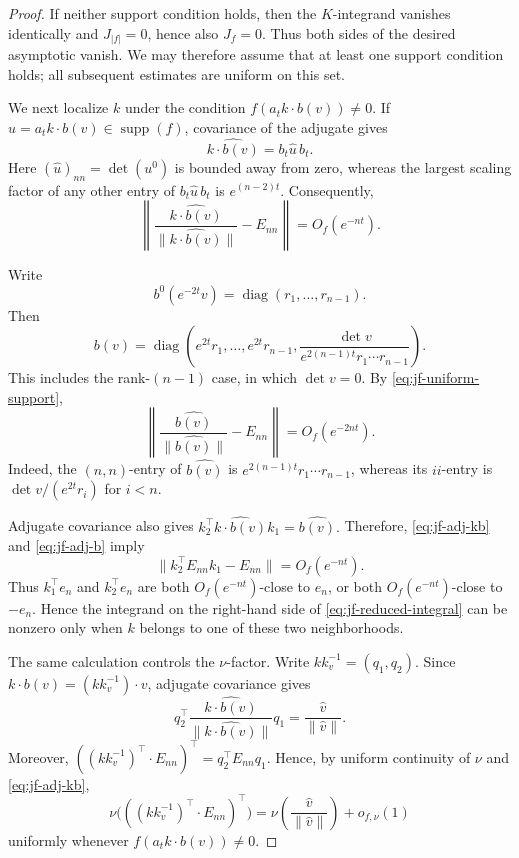 \documentclass[reqno,11pt]{amsart}
\numberwithin{equation}{section}
\theoremstyle{definition}
\theoremstyle{remark}
\newcommand{\op}{\operatorname}
\newcommand{\diag}{\op{diag}}
\begin{document}
\begin{proof}
If neither support condition holds, then the $K$-integrand vanishes
identically and $J_{|f|}=0$, hence also $J_f=0$. Thus both sides of the
desired asymptotic vanish. We may therefore assume that at least one
support condition holds; all subsequent estimates are uniform on this
set.

We next localize $k$ under the condition
$f(a_tk\cdot b(v))\ne0$. If
$u=a_tk\cdot b(v)\in\operatorname{supp}(f)$, covariance of the
adjugate gives
$$
\widehat{k\cdot b(v)}=b_t\widehat u\,b_t.
$$
Here $(\widehat u)_{nn}=\det(u^0)$ is bounded away from zero, whereas
the largest scaling factor of any other entry of
$b_t\widehat u\,b_t$ is $e^{(n-2)t}$. Consequently,
\begin{equation}\label{eq:jf-adj-kb}
\left\|
\frac{\widehat{k\cdot b(v)}}{\|\widehat{k\cdot b(v)}\|}-E_{nn}
\right\|
=O_f(e^{-nt}).
\end{equation}

Write
$$
b^0(e^{-2t}v)=\diag(r_1,\ldots,r_{n-1}).
$$
Then
$$
b(v)=\diag\left(
e^{2t}r_1,\ldots,e^{2t}r_{n-1},
\frac{\det v}{e^{2(n-1)t}r_1\cdots r_{n-1}}
\right).
$$
This includes the rank-$(n-1)$ case, in which $\det v=0$. By
\eqref{eq:jf-uniform-support},
\begin{equation}\label{eq:jf-adj-b}
\left\|
\frac{\widehat{b(v)}}{\|\widehat{b(v)}\|}-E_{nn}
\right\|
=O_f(e^{-2nt}).
\end{equation}
Indeed, the $(n, n)$-entry of $\widehat{b(v)}$ is
$e^{2(n-1)t}r_1\cdots r_{n-1}$, whereas its $ii$-entry is
$\det v/(e^{2t}r_i)$ for $i<n$.

Adjugate covariance also gives
$
k_2^{\intercal}\widehat{k\cdot b(v)}k_1=\widehat{b(v)}.
$
Therefore, \eqref{eq:jf-adj-kb} and \eqref{eq:jf-adj-b} imply
\begin{equation}\label{eq:jf-k-localization}
\|k_2^{\intercal}E_{nn}k_1-E_{nn}\|=O_f(e^{-nt}).
\end{equation}
Thus $k_1^{\intercal}e_n$ and $k_2^{\intercal}e_n$ are both
$O_f(e^{-nt})$-close to $e_n$, or both $O_f(e^{-nt})$-close to
$-e_n$. Hence the integrand on the right-hand side of
\eqref{eq:jf-reduced-integral} can be nonzero only when $k$ belongs to one of these two
neighborhoods.

The same calculation controls the $\nu$-factor. Write
$kk_v^{-1}=(q_1,q_2)$. Since
$k\cdot b(v)=(kk_v^{-1})\cdot v$, adjugate covariance gives
$$
q_2^{\intercal}
\frac{\widehat{k\cdot b(v)}}{\|\widehat{k\cdot b(v)}\|}
q_1
=
\frac{\widehat v}{\|\widehat v\|}.
$$
Moreover,
$
((kk_v^{-1})^{\intercal}\cdot E_{nn})^{\intercal}
=q_2^{\intercal}E_{nn}q_1.
$
Hence, by uniform continuity of $\nu$ and \eqref{eq:jf-adj-kb},
\begin{equation}\label{eq:jf-nu-uniform}
\nu\bigl(((kk_v^{-1})^{\intercal}\cdot E_{nn})^{\intercal}\bigr)
=
\nu\!\left(\frac{\widehat v}{\|\widehat v\|}\right)
+o_{f,\nu}(1)
\end{equation}
uniformly whenever $f(a_tk\cdot b(v))\ne0$.


\end{proof}
\end{document}
